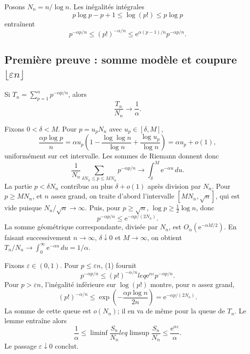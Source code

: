 \documentclass[11pt,a4paper]{article}
\newcommand{\e}{\mathrm e}
\newcommand{\eps}{\varepsilon}
\begin{document}
Posons $N_n=n/\log n$. Les inégalités intégrales
\[
p\log p-p+1\leq\log(p!)\leq p\log p
\]
entraînent
\begin{equation}
p^{-\alpha p/n}\leq(p!)^{-\alpha/n}
\leq \e^{\alpha(p-1)/n}p^{-\alpha p/n}.\tag{1}
\end{equation}

\subsection{Première preuve : somme modèle et coupure $\lfloor\eps n\rfloor$}

\begin{lemmabox}[title=Somme modèle]
Si $T_n=\sum_{p=1}^{n}p^{-\alpha p/n}$, alors
\[
\frac{T_n}{N_n}\longrightarrow\frac1\alpha.
\]
\end{lemmabox}

\begin{proofbox}
Fixons $0<\delta<M$. Pour $p=u_pN_n$ avec
$u_p\in[\delta,M]$,
\[
\frac{\alpha p\log p}{n}
=\alpha u_p\left(1-\frac{\log\log n}{\log n}
+\frac{\log u_p}{\log n}\right)=\alpha u_p+o(1),
\]
uniformément sur cet intervalle. Les sommes de Riemann donnent donc
\[
\frac1{N_n}\sum_{\delta N_n\leq p\leq MN_n}p^{-\alpha p/n}
\to\int_\delta^M\e^{-\alpha u}\,du.
\]
La partie $p<\delta N_n$ contribue au plus $\delta+o(1)$ après division par
$N_n$. Pour $p\geq MN_n$, et $n$ assez grand, on traite d'abord l'intervalle
$[MN_n,\sqrt n]$, qui est vide puisque $N_n/\sqrt n\to\infty$. Puis, pour
$p\geq\sqrt n$, $\log p\geq\frac12\log n$, donc
\[
p^{-\alpha p/n}\leq\e^{-\alpha p/(2N_n)}.
\]
La somme géométrique correspondante, divisée par $N_n$, est
$O_\alpha(\e^{-\alpha M/2})$. En faisant successivement
$n\to\infty$, $\delta\downarrow0$ et $M\to\infty$, on obtient
$T_n/N_n\to\int_0^\infty\e^{-\alpha u}\,du=1/\alpha$.
\end{proofbox}

\begin{proofbox}[title=Comparaison avec la factorielle]
Fixons $\eps\in(0,1)$. Pour $p\leq\eps n$, (1) fournit
\[
p^{-\alpha p/n}\leq(p!)^{-\alpha/n}leq
\e^{\alpha\eps}p^{-\alpha p/n}.
\]
Pour $p>\eps n$, l'inégalité inférieure sur $\log(p!)$ montre, pour $n$
assez grand,
\[
(p!)^{-\alpha/n}\leq\exp\left(-\frac{\alpha p\log n}{2n}\right)
=\e^{-\alpha p/(2N_n)}.
\]
La somme de cette queue est $o(N_n)$; il en va de même pour la queue de
$T_n$. Le lemme entraîne alors
\[
\frac1\alpha\leq\liminf\frac{S_n}{N_n}leq
\limsup\frac{S_n}{N_n}\leq\frac{\e^{\alpha\eps}}\alpha.
\]
Le passage $\eps\downarrow0$ conclut.
\end{proofbox}
\end{document}
